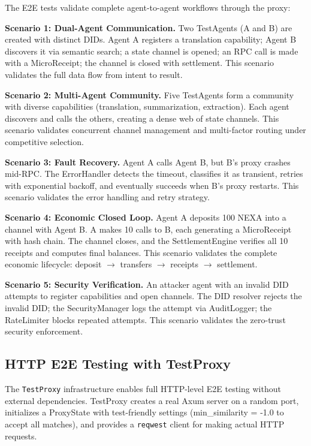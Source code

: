 The E2E tests validate complete agent-to-agent workflows through the proxy:

\textbf{Scenario 1: Dual-Agent Communication.} Two TestAgents (A and B) are created with distinct DIDs. Agent A registers a translation capability; Agent B discovers it via semantic search; a state channel is opened; an RPC call is made with a MicroReceipt; the channel is closed with settlement. This scenario validates the full data flow from intent to result.

\textbf{Scenario 2: Multi-Agent Community.} Five TestAgents form a community with diverse capabilities (translation, summarization, extraction). Each agent discovers and calls the others, creating a dense web of state channels. This scenario validates concurrent channel management and multi-factor routing under competitive selection.

\textbf{Scenario 3: Fault Recovery.} Agent A calls Agent B, but B's proxy crashes mid-RPC. The ErrorHandler detects the timeout, classifies it as transient, retries with exponential backoff, and eventually succeeds when B's proxy restarts. This scenario validates the error handling and retry strategy.

\textbf{Scenario 4: Economic Closed Loop.} Agent A deposits 100 NEXA into a channel with Agent B. A makes 10 calls to B, each generating a MicroReceipt with hash chain. The channel closes, and the SettlementEngine verifies all 10 receipts and computes final balances. This scenario validates the complete economic lifecycle: deposit $\rightarrow$ transfers $\rightarrow$ receipts $\rightarrow$ settlement.

\textbf{Scenario 5: Security Verification.} An attacker agent with an invalid DID attempts to register capabilities and open channels. The DID resolver rejects the invalid DID; the SecurityManager logs the attempt via AuditLogger; the RateLimiter blocks repeated attempts. This scenario validates the zero-trust security enforcement.

\subsection{HTTP E2E Testing with TestProxy}

The \texttt{TestProxy} infrastructure enables full HTTP-level E2E testing without external dependencies. TestProxy creates a real Axum server on a random port, initializes a ProxyState with test-friendly settings (min\_similarity = -1.0 to accept all matches), and provides a \texttt{reqwest} client for making actual HTTP requests.

